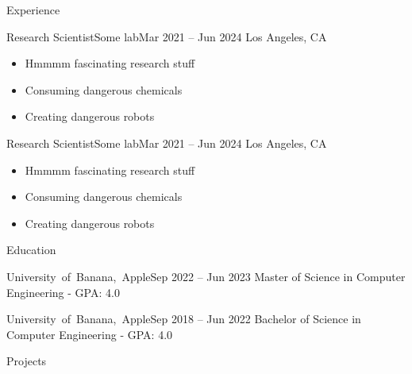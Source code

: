 \documentclass[]{../mcdowellcv}
\begin{document}
\makeheader

\begin{cvsection}{Experience}

    \begin{cvsubsection}{Research Scientist}{Some lab}{Mar 2021 -- Jun 2024}
        Los Angeles, CA
        \vspace{2.5mm}
        \begin{itemize}
            \item Hmmmm fascinating research stuff
            \item Consuming dangerous chemicals
            \item Creating dangerous robots
        \end{itemize}
    \end{cvsubsection}
    
    \begin{cvsubsection}{Research Scientist}{Some lab}{Mar 2021 -- Jun 2024}
        Los Angeles, CA
        \vspace{2.5mm}
        \begin{itemize}
            \item Hmmmm fascinating research stuff
            \item Consuming dangerous chemicals
            \item Creating dangerous robots
        \end{itemize}
    \end{cvsubsection}
    
\end{cvsection}

\begin{cvsection}{Education}

    \begin{cvsubsection}{\mbox {University of Banana, Apple}}{}{Sep 2022 -- Jun 2023}
        Master of Science in Computer Engineering - GPA: 4.0
    \end{cvsubsection}
    
    \begin{cvsubsection}{\mbox {University of Banana, Apple}}{}{Sep 2018 -- Jun 2022}
        Bachelor of Science in Computer Engineering - GPA: 4.0
    \end{cvsubsection}
     
\end{cvsection}

\begin{cvsection}{Projects}

\end{cvsection}
\end{document}
